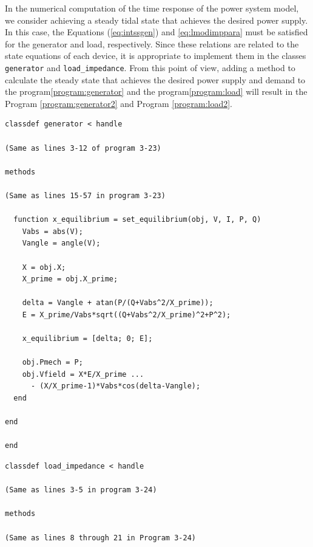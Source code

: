 \documentclass[graybox, envcountchap]{svmult}
\begin{document}
\begin{example}
In the numerical computation of the time response of the power system model, we consider achieving a steady tidal state that achieves the desired power supply.
In this case, the Equations (\ref{eq:intssgen}) and \ref{eq:lmodimppara} must be satisfied for the generator and load, respectively.
Since these relations are related to the state equations of each device, it is appropriate to implement them in the classes \verb|generator| and \verb|load_impedance|.
From this point of view, adding a method to calculate the steady state that achieves the desired power supply and demand to the program\ref{program:generator} and the program\ref{program:load} will result in the Program \nobreak\ref{program:generator2} and Program \ref{program:load2}.

\smallskip
\begin{PROGRAMA}[count,title={generator.m}]\label{program:generator2}
  \begin{verbatim}
classdef generator < handle
  
(Same as lines 3-12 of program 3-23)

methods

(Same as lines 15-57 in program 3-23)

  function x_equilibrium = set_equilibrium(obj, V, I, P, Q)
    Vabs = abs(V);
    Vangle = angle(V);
    
    X = obj.X;
    X_prime = obj.X_prime;
    
    delta = Vangle + atan(P/(Q+Vabs^2/X_prime));
    E = X_prime/Vabs*sqrt((Q+Vabs^2/X_prime)^2+P^2);
    
    x_equilibrium = [delta; 0; E];
    
    obj.Pmech = P;
    obj.Vfield = X*E/X_prime ...
      - (X/X_prime-1)*Vabs*cos(delta-Vangle);
  end

end
  
end
\end{verbatim}
\end{PROGRAMA}

\smallskip
\begin{PROGRAMA}[count,title={load\_impedance.m}]\label{program:load2}
\begin{verbatim}
classdef load_impedance < handle
  
(Same as lines 3-5 in program 3-24)

methods
  
(Same as lines 8 through 21 in Program 3-24)


\end{verbatim}
\end{PROGRAMA}
\end{example}
\end{document}
